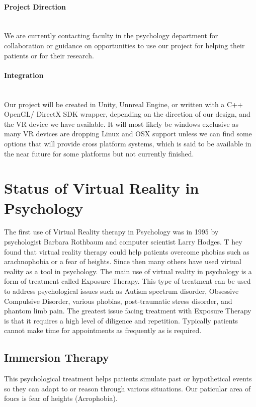 \documentclass[a4paper,10pt]{article}
\begin{document}
	
	\paragraph{Project Direction} ~\\ We are currently contacting faculty in the psychology department for collaboration or guidance on opportunities to use our project for helping their patients or for their research.
	\paragraph{Integration} ~\\ Our project will be created in Unity, Unnreal Engine, or written with a C++ OpenGL/ DirectX SDK wrapper, depending on the direction of our design, and the VR device we have available. It will most likely be windows exclusive as many VR devices are dropping Linux and OSX support unless we can find some options that will provide cross platform systems, which is said to be available in the near future for some platforms but not currently finished.  
	
	\pagebreak
	
	\section{Status of Virtual Reality in Psychology}
	The first use of Virtual Reality therapy in Psychology was in 1995 by psychologist Barbara Rothbaum and computer scientist Larry Hodges. T
	hey found that virtual reality therapy could help patients overcome phobias such as arachnophobia or a fear of heights. Since then many others 
	have used virtual reality as a tool in psychology. The main use of virtual reality in psychology is a form of treatment called Exposure Therapy. 
	This type of treatment can be used to address psychological issues such as Autism spectrum disorder, Obsessive Compulsive Disorder, various phobias, 
	post-traumatic stress disorder, and phantom limb pain. The greatest issue facing treatment with Exposure Therapy is that it requires a high level of diligence and
	repetition. Typically patients cannot make time for appointments as frequently as is required.
	
	\subsection{Immersion Therapy}
	This psychological treatment helps patients simulate past or hypothetical events so they can adapt to or reason through
	various situations. Our paticular area of foucs is fear of heights (Acrophobia).
\end{document}
